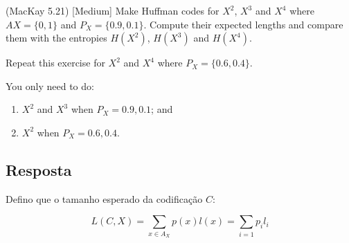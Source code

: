 (MacKay 5.21) [Medium]
Make Huffman codes for $X^2$, $X^3$ and $X^4$ where $AX = \{0, 1\}$ and $P_X = \{0.9, 0.1\}$. Compute their expected lengths and compare them with the entropies $H(X^2)$, $H(X^3)$ and $H(X^4)$.

Repeat this exercise for $X^2$ and $X^4$ where $P_X = \{0.6, 0.4\}$.

You only need to do:
\begin{enumerate}
    \item $X^2$ and $X^3$ when $P_X = {0.9, 0.1}$; and
    
    \item $X^2$ when $P_X = {0.6, 0.4}$.
\end{enumerate}

\subsection*{Resposta}

Defino que o tamanho esperado da codificação $C$:

\[L(C, X) = \sum_{x \in A_X}{p(x)l(x)} = \sum_{i = 1}{p_i l_i}\]

